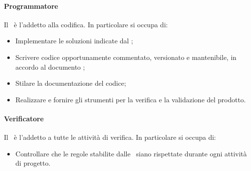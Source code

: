 \documentclass[../NormeDiProgetto.tex]{subfiles}
\begin{document}
				\paragraph{Programmatore\\}
					Il \programmatore\ è l'addetto alla codifica. In particolare si occupa di:
					\begin{itemize}
						\item Implementare le soluzioni indicate dal \progettista;
						\item Scrivere codice opportunamente commentato, versionato e mantenibile, in
						accordo al documento \normediprogetto;
						\item Stilare la documentazione del codice;
						\item Realizzare e fornire gli strumenti per la verifica e la validazione
						del prodotto.
					\end{itemize}
				\paragraph{Verificatore\\}
					Il \verificatore\ è l'addetto a tutte le attività di verifica.
					In particolare si occupa di:
					\begin{itemize}
						\item Controllare che le regole stabilite dalle \normediprogetto\ siano
						rispettate durante ogni attività di progetto.
					\end{itemize}
				
				
				
\end{document}
